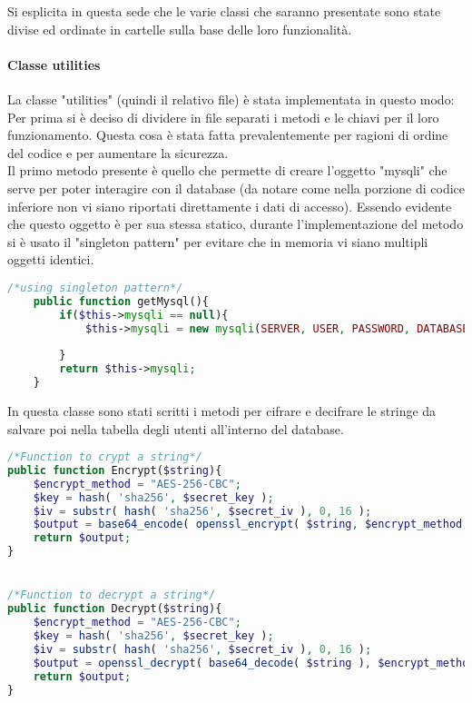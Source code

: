 Si esplicita in questa sede che le varie classi che saranno presentate sono state divise ed ordinate in cartelle sulla base delle loro funzionalità.\\

\paragraph{Classe utilities}
La classe "utilities" (quindi il relativo file) è stata implementata in questo modo:\\
Per prima si è deciso di dividere in file separati i metodi e le chiavi per il loro funzionamento. Questa cosa è stata fatta prevalentemente per ragioni di ordine del codice e per aumentare la sicurezza.\\
Il primo metodo presente è quello che permette di creare l'oggetto "mysqli" che serve per poter interagire con il database (da notare come nella porzione di codice inferiore non vi siano riportati direttamente i dati di accesso). Essendo evidente che questo oggetto è per sua stessa statico, durante l'implementazione del metodo si è usato il "singleton pattern" per evitare che in memoria vi siano multipli oggetti identici.\\

\begin{lstlisting}[language=php]
	/*using singleton pattern*/
	public function getMysql(){
		if($this->mysqli == null){
			$this->mysqli = new mysqli(SERVER, USER, PASSWORD, DATABASE);
			
		}
		return $this->mysqli;
	}
\end{lstlisting}

In questa classe sono stati scritti i metodi per cifrare e decifrare le stringe da salvare poi nella tabella degli utenti all'interno del database.\\

\begin{lstlisting}[language=php]
/*Function to crypt a string*/
public function Encrypt($string){
	$encrypt_method = "AES-256-CBC";
	$key = hash( 'sha256', $secret_key );
	$iv = substr( hash( 'sha256', $secret_iv ), 0, 16 );
	$output = base64_encode( openssl_encrypt( $string, $encrypt_method, $key, 0, $iv ) );
	return $output;
}


/*Function to decrypt a string*/
public function Decrypt($string){
	$encrypt_method = "AES-256-CBC";
	$key = hash( 'sha256', $secret_key );
	$iv = substr( hash( 'sha256', $secret_iv ), 0, 16 );
	$output = openssl_decrypt( base64_decode( $string ), $encrypt_method, $key, 0, $iv );
	return $output;
}
\end{lstlisting}

